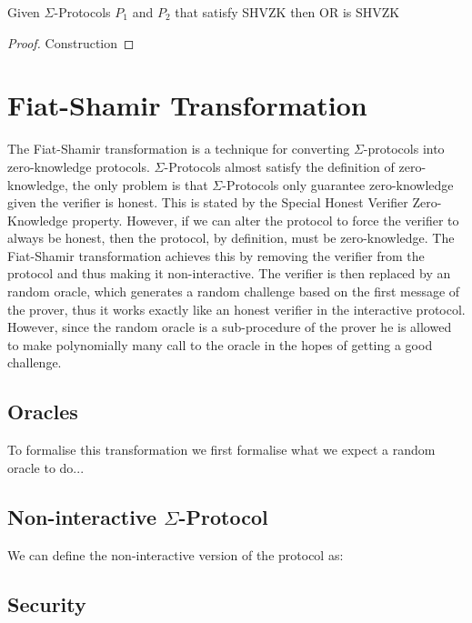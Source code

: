 \begin{lemma}[OR SHVZK]
  Given $\Sigma$-Protocols $P_{1}$ and $P_{2}$ that satisfy SHVZK then OR is SHVZK
\end{lemma}
\begin{proof}
  Construction
\end{proof}

\section{Fiat-Shamir Transformation}
\label{subsec:fiat-shamir}
The Fiat-Shamir transformation is a technique for converting $\Sigma$-protocols
into zero-knowledge protocols. $\Sigma$-Protocols almost satisfy the definition
of zero-knowledge, the only problem is that $\Sigma$-Protocols only guarantee
zero-knowledge given the verifier is honest. This is stated by the Special
Honest Verifier Zero-Knowledge property. However, if we can alter the protocol
to force the verifier to always be honest, then the protocol, by definition,
must be zero-knowledge.
The Fiat-Shamir transformation achieves this by removing the verifier from the
protocol and thus making it non-interactive. The verifier is then replaced by an
random oracle, which generates a random challenge based on the first message of
the prover, thus it works exactly like an honest verifier in the interactive
protocol. However, since the random oracle is a sub-procedure of the prover he
is allowed to make polynomially many call to the oracle in the hopes of getting
a good challenge.

\subsection{Oracles}
\label{subsec:sigma:fiat:oracle}


To formalise this transformation we first formalise what we expect a random
oracle to do...

\subsection{Non-interactive $\Sigma$-Protocol}
\label{subsec:sigma:fiat:protocol}

We can define the non-interactive version of the protocol as:

\subsection{Security}
\label{subsec:sigma:fiat:security}


